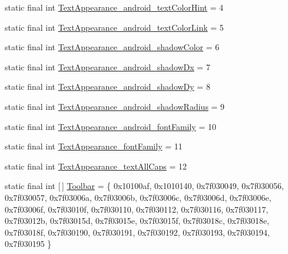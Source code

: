 \begin{DoxyCompactItemize}
\item 
static final int \mbox{\hyperlink{classcom_1_1synnapps_1_1carouselview_1_1_r_1_1styleable_a4bf7e8aee51e93d0eb55e91235b8b573}{Text\+Appearance\+\_\+android\+\_\+text\+Color\+Hint}} = 4
\item 
static final int \mbox{\hyperlink{classcom_1_1synnapps_1_1carouselview_1_1_r_1_1styleable_a41bb57ceafc1fd7d1d837a94544ce304}{Text\+Appearance\+\_\+android\+\_\+text\+Color\+Link}} = 5
\item 
static final int \mbox{\hyperlink{classcom_1_1synnapps_1_1carouselview_1_1_r_1_1styleable_acb807782e77de691bb7262fd1bed1203}{Text\+Appearance\+\_\+android\+\_\+shadow\+Color}} = 6
\item 
static final int \mbox{\hyperlink{classcom_1_1synnapps_1_1carouselview_1_1_r_1_1styleable_a63187c01ad7fd731baef61b23d3c5e99}{Text\+Appearance\+\_\+android\+\_\+shadow\+Dx}} = 7
\item 
static final int \mbox{\hyperlink{classcom_1_1synnapps_1_1carouselview_1_1_r_1_1styleable_a68e251a6b30a6f91238bbd8f259c4b2a}{Text\+Appearance\+\_\+android\+\_\+shadow\+Dy}} = 8
\item 
static final int \mbox{\hyperlink{classcom_1_1synnapps_1_1carouselview_1_1_r_1_1styleable_a0b0c7b102df6dcbfb2dfa81e12bd17af}{Text\+Appearance\+\_\+android\+\_\+shadow\+Radius}} = 9
\item 
static final int \mbox{\hyperlink{classcom_1_1synnapps_1_1carouselview_1_1_r_1_1styleable_a3ebc1044844fb3d118e439b777a3d01a}{Text\+Appearance\+\_\+android\+\_\+font\+Family}} = 10
\item 
static final int \mbox{\hyperlink{classcom_1_1synnapps_1_1carouselview_1_1_r_1_1styleable_a550390824bb11ec76085fd2f9e72f0e4}{Text\+Appearance\+\_\+font\+Family}} = 11
\item 
static final int \mbox{\hyperlink{classcom_1_1synnapps_1_1carouselview_1_1_r_1_1styleable_ace067d9eff15095dc54e45e158e19168}{Text\+Appearance\+\_\+text\+All\+Caps}} = 12
\item 
static final int \mbox{[}$\,$\mbox{]} \mbox{\hyperlink{classcom_1_1synnapps_1_1carouselview_1_1_r_1_1styleable_a726ceb9bda67619ef1b78adbecc59308}{Toolbar}} = \{ 0x10100af, 0x1010140, 0x7f030049, 0x7f030056, 0x7f030057, 0x7f03006a, 0x7f03006b, 0x7f03006c, 0x7f03006d, 0x7f03006e, 0x7f03006f, 0x7f03010f, 0x7f030110, 0x7f030112, 0x7f030116, 0x7f030117, 0x7f03012b, 0x7f03015d, 0x7f03015e, 0x7f03015f, 0x7f03018c, 0x7f03018e, 0x7f03018f, 0x7f030190, 0x7f030191, 0x7f030192, 0x7f030193, 0x7f030194, 0x7f030195 \}
\item 

\end{DoxyCompactItemize}
